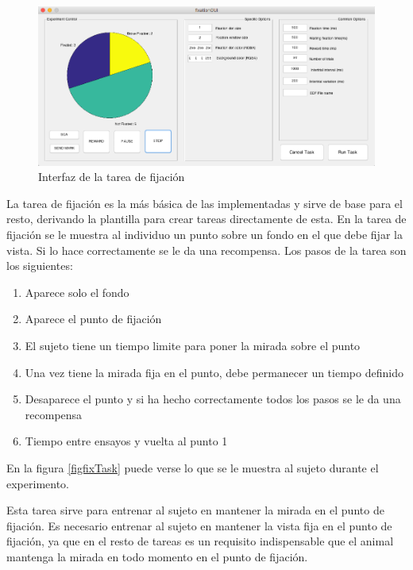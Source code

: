 \documentclass[conference]{IEEEtran}
\begin{document}
\begin{figure}[htbp]
\centerline{\includegraphics[width=\linewidth]{figures/fixation_gui}}
\caption{Interfaz de la tarea de fijación}
\label{figfixGUI}
\end{figure}

La tarea de fijación es la más básica de las implementadas y sirve de base para el resto, derivando la plantilla para crear tareas directamente de esta. 
En la tarea de fijación se le muestra al individuo un punto sobre un fondo en el que debe fijar la vista. Si lo hace correctamente se le da una recompensa.
Los pasos de la tarea son los siguientes:

\begin{enumerate}
	\item Aparece solo el fondo
	\item Aparece el punto de fijación
	\item El sujeto tiene un tiempo limite para poner la mirada sobre el punto
	\item Una vez tiene la mirada fija en el punto, debe permanecer un tiempo definido
	\item Desaparece el punto y si ha hecho correctamente todos los pasos se le da una recompensa
	\item Tiempo entre ensayos y vuelta al punto 1
\end{enumerate}

En la figura \ref{figfixTask} puede verse lo que se le muestra al sujeto durante el experimento. 

Esta tarea sirve para entrenar al sujeto en mantener la mirada en el punto de fijación. Es necesario entrenar al sujeto en mantener la vista fija en el punto de fijación, ya que en el resto de tareas es un requisito indispensable que el animal mantenga la mirada en todo momento en el punto de fijación.
\end{document}
